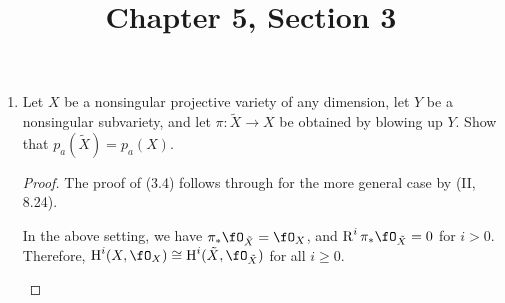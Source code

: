 \documentclass[a4paper]{article}
\title{Chapter 5, Section 3}
\begin{document}
\maketitle

\begin{enumerate} [label=\textbf{\arabic*.}, leftmargin=0em]

    \item Let $X$ be a nonsingular projective variety of any dimension, let $Y$ be a nonsingular subvariety, and let $\pi : \tilde{X} \to X$ be obtained by blowing up $Y$.
          Show that $p_a(\tilde{X}) = p_a(X)$.

          \begin{proof}
              The proof of (3.4) follows through for the more general case by (II, 8.24).

              \begin{proposition}
                  In the above setting, we have $\pi_*\fO_{\tilde{X}} = \fO_X$, and $\dR^i \pi_*\fO_{\tilde{X}} = 0$ for $i > 0$.
                  Therefore, $\cH^i(X, \fO_X) \cong \cH^i(\tilde{X}, \fO_{\tilde{X}})$ for all $i \geq 0$.
              \end{proposition}
          \end{proof}




\end{enumerate}
\end{document}
